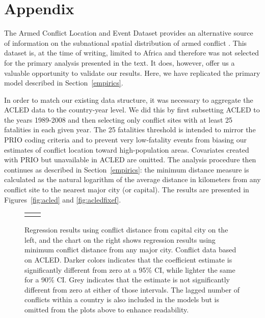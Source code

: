 \section{Appendix}
\label{appendix}

The Armed Conflict Location and Event Dataset provides an alternative source of information on the subnational spatial distribution of armed conflict \citep{raleigh:linke:etal:2010}. This dataset is, at the time of writing, limited to Africa and therefore was not selected for the primary analysis presented in the text. It does, however, offer us a valuable opportunity to validate our results. Here, we have replicated the primary model described in Section~\ref{empirics}.

In order to match our existing data structure, it was necessary to aggregate the ACLED data to the country-year level. We did this by first subsetting ACLED to the years 1989-2008 and then selecting only conflict sites with at least 25 fatalities in each given year. The 25 fatalities threshold is intended to mirror the PRIO coding criteria and to prevent very low-fatality events from biasing our estimates of conflict location toward high-population areas. Covariates created with PRIO but unavailable in ACLED are omitted. The analysis procedure then continues as described in Section~\ref{empirics}: the minimum distance measure is calculated as the natural logarithm of the average distance in kilometers from any conflict site to the nearest major city (or capital). The results are presented in Figures~\ref{fig:acled} and \ref{fig:acledfixef}. 

\begin{figure}
	\centering
	\begin{tabular}{cc}
		\subfloat[SubFigure 1][Capital City]{
			\resizebox{.45\textwidth}{!}{}
		\label{fig:acled}} &
		\subfloat[SubFigure 2][Any Major City]{
			\resizebox{.45\textwidth}{!}{}
		\label{fig:acledfixef}}
	\end{tabular}
	\caption{Regression results using conflict distance from capital city on the left, and the chart on the right shows regression results using minimum conflict distance from any major city. Conflict data based on ACLED. Darker colors indicates that the coefficient estimate is significantly different from zero at a 95\% CI, while lighter the same for a 90\% CI. Grey indicates that the estimate is not significantly different from zero at either of those intervals. The lagged number of conflicts within a country is also included in the models but is omitted from the plots above to enhance readability.}
	\label{fig:coefplot}
\end{figure}